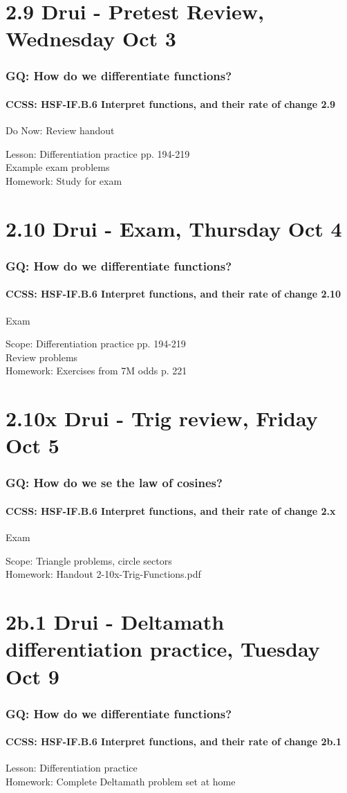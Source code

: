 \documentclass{beamer}
\begin{document}
\section{2.9 Drui - Pretest Review, Wednesday Oct 3}
  \frame
  {
    \frametitle{GQ: How do we differentiate functions?}
    \framesubtitle{CCSS: HSF-IF.B.6 Interpret functions, and their rate of change  \alert{2.9}}

    \begin{block}{Do Now: Review handout}
    \end{block}
    Lesson: Differentiation practice pp. 194-219\\
    Example exam problems\\ \bigskip
    Homework: Study for exam
  }

\section{2.10 Drui - Exam, Thursday Oct 4}
  \frame
  {
    \frametitle{GQ: How do we differentiate functions?}
    \framesubtitle{CCSS: HSF-IF.B.6 Interpret functions, and their rate of change  \alert{2.10}}

    \begin{block}{Exam}
    \end{block}
    Scope: Differentiation practice pp. 194-219\\
    Review problems\\ \bigskip
    Homework: Exercises from 7M odds p. 221
  }

\section{2.10x Drui - Trig review, Friday Oct 5}
  \frame
  {
    \frametitle{GQ: How do we se the law of cosines?}
    \framesubtitle{CCSS: HSF-IF.B.6 Interpret functions, and their rate of change  \alert{2.x}}

    \begin{block}{Exam}
    \end{block}
    Scope: Triangle problems, circle sectors\\ \bigskip
    Homework: Handout 2-10x-Trig-Functions.pdf
  }

\section{2b.1 Drui - Deltamath differentiation practice, Tuesday Oct 9}
  \frame
  {
    \frametitle{GQ: How do we differentiate functions?}
    \framesubtitle{CCSS: HSF-IF.B.6 Interpret functions, and their rate of change  \alert{2b.1}}

    Lesson: Differentiation practice \\ \bigskip
    Homework: Complete Deltamath problem set at home
  }
\end{document}
